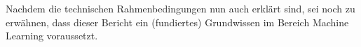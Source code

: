 Nachdem die technischen Rahmenbedingungen nun auch erklärt sind, sei noch zu erwähnen, dass dieser Bericht ein (fundiertes) Grundwissen im Bereich Machine Learning voraussetzt.






